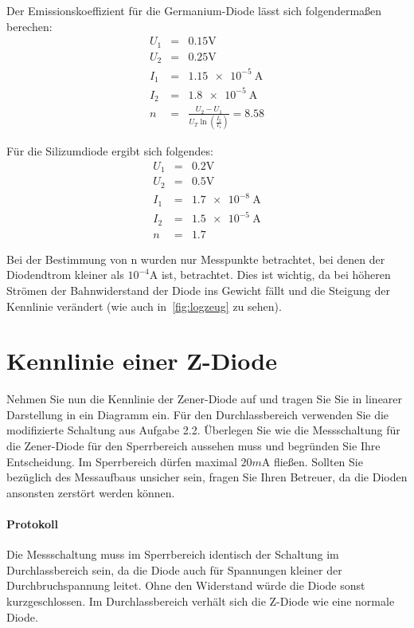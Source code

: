 \documentclass[10pt]{scrreprt}
\begin{document}
    Der Emissionskoeffizient für die Germanium-Diode lässt sich folgendermaßen berechen:
    \begin{eqnarray*}
        U_1 &=& 0.15\si{\volt}\\
        U_2 &=& 0.25\si{\volt}\\
        I_1 &=& \SI{1.15e-5}{\ampere}\\
        I_2 &=& \SI{1.8e-5}{\ampere}\\
        n &=& \frac{U_2 - U_1}{U_T\ln\left(\frac{I_2}{I_1}\right)} = 8.58
    \end{eqnarray*}

    Für die Silizumdiode ergibt sich folgendes:
    \begin{eqnarray*}
        U_1 &=& 0.2\si{\volt}\\
        U_2 &=& 0.5\si{\volt}\\
        I_1 &=& \SI{1.7e-8}{\ampere}\\
        I_2 &=& \SI{1.5e-5}{\ampere}\\
        n &=& 1.7
    \end{eqnarray*}

    Bei der Bestimmung von n wurden nur Messpunkte betrachtet, bei denen der Diodendtrom
    kleiner als $10^{-4}\si{\ampere}$ ist, betrachtet. Dies ist wichtig, da bei
    höheren Strömen der Bahnwiderstand der Diode ins Gewicht fällt und die Steigung
    der Kennlinie verändert (wie auch in~\ref{fig:logzeug} zu sehen).

    \section{Kennlinie einer Z-Diode}
    Nehmen Sie nun die Kennlinie der Zener-Diode auf und tragen Sie Sie in linearer Darstellung
    in ein Diagramm ein. Für den Durchlassbereich verwenden Sie die modifizierte
    Schaltung aus Aufgabe 2.2. Überlegen Sie wie die Messschaltung für die Zener-Diode für
    den Sperrbereich aussehen muss und begründen Sie Ihre Entscheidung. Im Sperrbereich
    dürfen maximal $20\si{m\ampere}$ fließen. Sollten Sie bezüglich des Messaufbaus unsicher sein, fragen
    Sie Ihren Betreuer, da die Dioden ansonsten zerstört werden können.

    \paragraph{Protokoll}
    Die Messschaltung muss im Sperrbereich identisch der Schaltung im Durchlassbereich
    sein, da die Diode auch für Spannungen kleiner der Durchbruchspannung leitet.
    Ohne den Widerstand würde die Diode sonst kurzgeschlossen. Im Durchlassbereich
    verhält sich die Z-Diode wie eine normale Diode.
\end{document}
